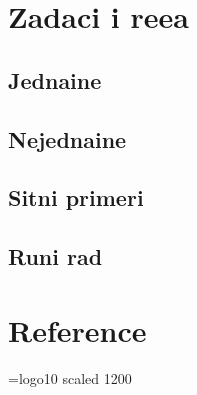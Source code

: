 \documentclass[12pt, twoside, a4paper]{article}
\def\navod#1{\relax,\kern-0.06667em,\relax#1\relax``\relax}
\begin{document}
\section{Zadaci i re{\sv}e{\nj}a}

\subsection{Jedna{\cv}ine}
\def\jed{Jedna{\cv}ina~}










\clearpage

\subsection{Nejedna{\cv}ine}







% 


\clearpage


\subsection{Sitni primeri}









\clearpage

\subsection{Ru{\cv}ni rad}





\vfill



\section{Reference}


\renewcommand{\labelenumi}{[{\it\arabic{enumi}\/}]}
\def\lit#1#2#3(#4){\item #1: {\navod{#2}}, {\sl#3\/} (#4)}
\font\logoten=logo10 scaled 1200
\def\MP{{\logoten METAPOST}}
\def\link#1#2{\item\href{#1}{#2}\hfill\break\href{#1}{\footnotesize\tt#1}}
\end{document}

